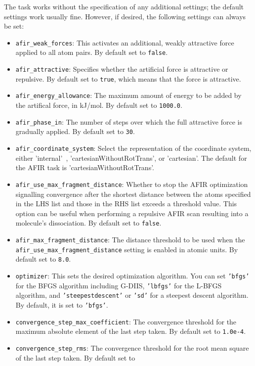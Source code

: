 \documentclass[]{tufte-book}
\begin{document}
The task works without the specification of any additional settings; the default settings work usually fine. However,
if desired, the following settings can always be set:
\begin{itemize}
\item \texttt{afir\_weak\_forces}: This activates an additional, weakly attractive force applied to all atom pairs. By
default set to \texttt{false}.
\item \texttt{afir\_attractive}: Specifies whether the artificial force is attractive or repulsive. By default set to
\texttt{true}, which means that the force is attractive.
\item \texttt{afir\_energy\_allowance}: The maximum amount of energy to be added by the artifical force, in kJ/mol.
By default set to \texttt{1000.0}.
\item \texttt{afir\_phase\_in}: The number of steps over which the full attractive force is gradually applied. By default
set to \texttt{30}.
\item \texttt{afir\_coordinate\_system}: Select the representation of the coordinate system, either 'internal'~\cite{libirc}, 'cartesianWithoutRotTrans', or 'cartesian'.
The default for the AFIR task is 'cartesianWithoutRotTrans'.
\item \texttt{afir\_use\_max\_fragment\_distance}: Whether to stop the AFIR optimization signalling convergence after
the shortest distance between the atoms specified in the LHS list and those in the RHS list exceeds a threshold value.
This option can be useful when performing a repulsive AFIR scan resulting into a molecule's dissociation. By default
set to \texttt{false}.
\item \texttt{afir\_max\_fragment\_distance}: The distance threshold to be used when the
\texttt{afir\_use\_max\_fragment\_distance} setting is enabled in atomic units. By default set to \texttt{8.0}.
\item \texttt{optimizer}: This sets the desired optimization algorithm. You can set \texttt{'bfgs'} for the BFGS algorithm including
G-DIIS, \texttt{'lbfgs'} for the L-BFGS algorithm, and
\texttt{'steepestdescent'} or \texttt{'sd'} for a steepest descent algorithm. By default, it is set to \texttt{'bfgs'}.
\item \texttt{convergence\_step\_max\_coefficient}: The convergence threshold for the maximum absolute element of the last step taken.
By default set to \texttt{1.0e-4}.
\item \texttt{convergence\_step\_rms}: The convergence threshold for the root mean square of the last step taken. By default set to

\end{itemize}
\end{document}
